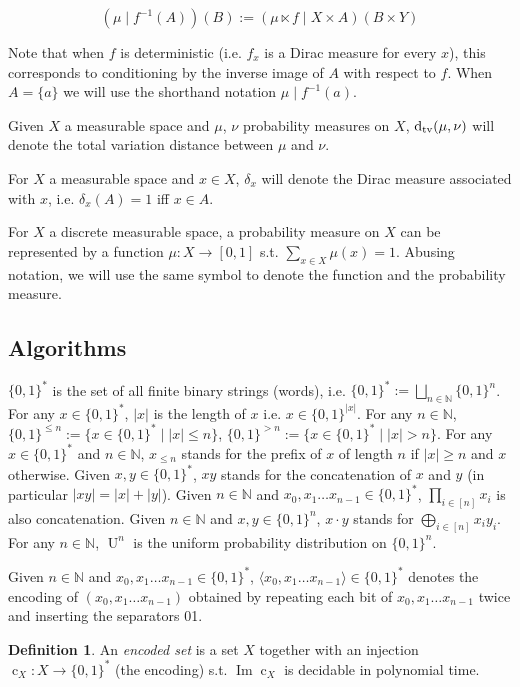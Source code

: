 \documentclass{article}
\numberwithin{equation}{section}
\theoremstyle{definition}
\newtheorem{definition}{Definition}[section]
\theoremstyle{plain}
\newcommand{\Bool}{\{0,1\}}
\newcommand{\Words}{{\Bool^*}}
\newcommand{\WordsLen}[1]{{\Bool^{#1}}}
\DeclareMathOperator{\Img}{Im}
\DeclareMathOperator{\Un}{U}
\DeclareMathOperator{\En}{c}
\newcommand{\Dtv}{\operatorname{d}_{\textnormal{tv}}}
\newcommand{\Nats}{\mathbb{N}}
\newcommand{\Abs}[1]{\lvert #1 \rvert}
\newcommand{\Chev}[1]{\langle #1 \rangle}
\begin{document}
\[(\mu \mid f^{-1}(A))(B):=(\mu \ltimes f \mid X \times A)(B \times Y)\]

Note that when $f$ is deterministic (i.e. $f_x$ is a Dirac measure for every $x$), this corresponds to conditioning by the inverse image of $A$ with respect to $f$. When $A=\{a\}$ we will use the shorthand notation $\mu \mid f^{-1}(a)$.

Given $X$ a measurable space and $\mu$, $\nu$ probability measures on $X$, $\Dtv(\mu,\nu)$ will denote the total variation distance between $\mu$ and $\nu$.

For $X$ a measurable space and $x \in X$, $\delta_x$ will denote the Dirac measure associated with $x$, i.e. $\delta_x(A)=1$ iff $x \in A$.

For $X$ a discrete measurable space, a probability measure on $X$ can be represented by a function $\mu: X \rightarrow [0,1]$ s.t. $\sum_{x \in X} \mu(x) = 1$. Abusing notation, we will use the same symbol to denote the function and the probability measure.

\subsection{Algorithms}

$\Words$ is the set of all finite binary strings (words), i.e. $\Words:=\bigsqcup_{n \in \Nats} \Bool^n$. For any $x \in \Words$, $\Abs{x}$ is the length of $x$ i.e. $x \in \WordsLen{\Abs{x}}$. For any $n \in \Nats$, $\Bool^{\leq n}:=\{x \in \Words \mid \Abs{x} \leq n\}$, ${\Bool^{>n}:=\{x \in \Words \mid \Abs{x} > n\}}$. For any $x \in \Words$ and $n \in \Nats$, $x_{\leq n}$ stands for the prefix of $x$ of length $n$ if $\Abs{x} \geq n$ and $x$ otherwise. Given $x,y \in \Words$, $xy$ stands for the concatenation of $x$ and $y$ (in particular $\Abs{xy}=\Abs{x}+\Abs{y}$). Given ${n \in \Nats}$ and ${x_0, x_1 \ldots x_{n-1} \in \Words}$, ${\prod_{i \in [n]} x_i}$ is also concatenation. Given $n \in \Nats$ and $x,y \in \WordsLen{n}$, $x \cdot y$ stands for $\bigoplus_{i \in [n]} x_i y_i$. For any $n \in \Nats$, $\Un^n$ is the uniform probability distribution on $\WordsLen{n}$.

Given $n \in \Nats$ and ${x_0, x_1 \ldots x_{n-1} \in \Words}$, $\Chev{x_0,x_1 \ldots x_{n-1}} \in \Words$ denotes the encoding of $(x_0,x_1 \ldots x_{n-1})$ obtained by repeating each bit of $x_0, x_1 \ldots x_{n-1}$ twice and inserting the separators 01.
\begin{definition}

An \emph{encoded set} is a set $X$ together with an injection ${\En_X: X \rightarrow \Words}$ (the encoding) s.t. $\Img \En_X$ is decidable in polynomial time.

\end{definition}
\end{document}
